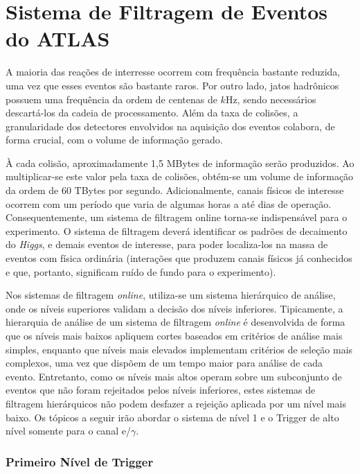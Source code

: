 

\chapter{Sistema de Filtragem de Eventos do ATLAS}
\label{cap:trigger}
\glsresetall


A maioria das reações de interresse ocorrem com frequência bastante reduzida, uma vez que esses
eventos são bastante raros. Por outro lado, jatos hadrônicos possuem uma frequência da ordem de centenas de $k$Hz, sendo necessários
descartá-los da cadeia de processamento. Além da taxa de colisões, a granularidade dos detectores 
envolvidos na aquisição dos eventos colabora, de forma crucial, com o volume de informação gerado.

À cada colisão, aproximadamente 1,5 MBytes de informação serão 
produzidos.  Ao multiplicar-se este valor pela taxa de colisões, obtém-se um volume de informação da ordem de 60 TBytes por segundo. 
Adicionalmente, canais físicos de interesse ocorrem com um período que varia de algumas horas a até dias de operação. 
Consequentemente, um sistema de filtragem online torna-se indispensável para o experimento. O sistema de filtragem deverá identificar os 
padrões de decaimento do \textit{Higgs}, e demais eventos de interesse, para poder localiza-los na massa de eventos com física ordinária (interações 
que produzem canais físicos já conhecidos e que, portanto, significam ruído de fundo para o experimento).

Nos sistemas de filtragem  \textit{online}, utiliza-se um sistema hierárquico de análise, onde os níveis superiores validam a decisão dos níveis inferiores. 
Tipicamente, a hierarquia de análise de um sistema de filtragem \textit{online} é desenvolvida de forma que os níveis mais baixos apliquem cortes baseados em critérios 
de análise mais simples, enquanto que níveis mais elevados implementam critérios de seleção mais complexos, uma vez que dispõem de um tempo maior para 
análise de cada evento. Entretanto, como os níveis mais altos operam sobre um subconjunto de eventos que não foram rejeitados pelos níveis inferiores, estes 
sistemas de filtragem hierárquicos não podem desfazer a rejeição aplicada por um nível mais baixo. Os tópicos a seguir irão abordar o sistema de nível 1 e 
o Trigger de alto nível somente para o canal e/$\gamma$.

\subsection{Primeiro Nível de Trigger}


